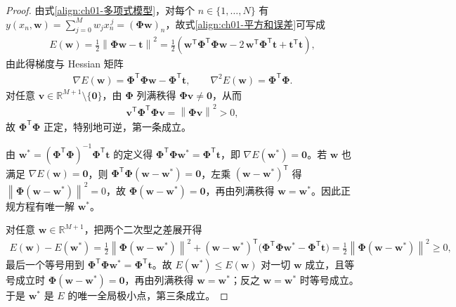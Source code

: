 \documentclass[../../main.tex]{subfiles}
\begin{document}
\begin{proof}
由式\eqref{align:ch01-多项式模型}，对每个 $n\in\{1,\dots,N\}$ 有 $y(x_n,\mathbf{w})=\sum_{j=0}^{M}w_jx_n^{\,j}=(\boldsymbol{\Phi}\mathbf{w})_n$，故式\eqref{align:ch01-平方和误差}可写成
\begin{align*}
 E(\mathbf{w}) = \frac{1}{2}\left\|\boldsymbol{\Phi}\mathbf{w}-\mathbf{t}\right\|^{2}
 = \frac{1}{2}\left(\mathbf{w}^{\mathsf{T}}\boldsymbol{\Phi}^{\mathsf{T}}\boldsymbol{\Phi}\mathbf{w}
 - 2\,\mathbf{w}^{\mathsf{T}}\boldsymbol{\Phi}^{\mathsf{T}}\mathbf{t}
 + \mathbf{t}^{\mathsf{T}}\mathbf{t}\right),
\end{align*}
由此得梯度与 Hessian 矩阵
\begin{align*}
 \nabla E(\mathbf{w}) = \boldsymbol{\Phi}^{\mathsf{T}}\boldsymbol{\Phi}\mathbf{w} - \boldsymbol{\Phi}^{\mathsf{T}}\mathbf{t},
 \qquad
 \nabla^{2} E(\mathbf{w}) = \boldsymbol{\Phi}^{\mathsf{T}}\boldsymbol{\Phi}.
\end{align*}
对任意 $\mathbf{v}\in\mathbb{R}^{M+1}\setminus\{\mathbf{0}\}$，由 $\boldsymbol{\Phi}$ 列满秩得 $\boldsymbol{\Phi}\mathbf{v}\neq\mathbf{0}$，从而
\begin{align*}
 \mathbf{v}^{\mathsf{T}}\boldsymbol{\Phi}^{\mathsf{T}}\boldsymbol{\Phi}\mathbf{v} = \left\|\boldsymbol{\Phi}\mathbf{v}\right\|^{2} > 0,
\end{align*}
故 $\boldsymbol{\Phi}^{\mathsf{T}}\boldsymbol{\Phi}$ 正定，特别地可逆，第一条成立。

由 $\mathbf{w}^{*}=(\boldsymbol{\Phi}^{\mathsf{T}}\boldsymbol{\Phi})^{-1}\boldsymbol{\Phi}^{\mathsf{T}}\mathbf{t}$ 的定义得 $\boldsymbol{\Phi}^{\mathsf{T}}\boldsymbol{\Phi}\mathbf{w}^{*}=\boldsymbol{\Phi}^{\mathsf{T}}\mathbf{t}$，即 $\nabla E(\mathbf{w}^{*})=\mathbf{0}$。若 $\mathbf{w}$ 也满足 $\nabla E(\mathbf{w})=\mathbf{0}$，则 $\boldsymbol{\Phi}^{\mathsf{T}}\boldsymbol{\Phi}(\mathbf{w}-\mathbf{w}^{*})=\mathbf{0}$，左乘 $(\mathbf{w}-\mathbf{w}^{*})^{\mathsf{T}}$ 得 $\left\|\boldsymbol{\Phi}(\mathbf{w}-\mathbf{w}^{*})\right\|^{2}=0$，故 $\boldsymbol{\Phi}(\mathbf{w}-\mathbf{w}^{*})=\mathbf{0}$，再由列满秩得 $\mathbf{w}=\mathbf{w}^{*}$。因此正规方程有唯一解 $\mathbf{w}^{*}$。

对任意 $\mathbf{w}\in\mathbb{R}^{M+1}$，把两个二次型之差展开得
\begin{align*}
 E(\mathbf{w}) - E(\mathbf{w}^{*})
 = \frac{1}{2}\left\|\boldsymbol{\Phi}(\mathbf{w}-\mathbf{w}^{*})\right\|^{2}
 + (\mathbf{w}-\mathbf{w}^{*})^{\mathsf{T}}\bigl(\boldsymbol{\Phi}^{\mathsf{T}}\boldsymbol{\Phi}\mathbf{w}^{*}-\boldsymbol{\Phi}^{\mathsf{T}}\mathbf{t}\bigr)
 = \frac{1}{2}\left\|\boldsymbol{\Phi}(\mathbf{w}-\mathbf{w}^{*})\right\|^{2} \geqslant 0,
\end{align*}
最后一个等号用到 $\boldsymbol{\Phi}^{\mathsf{T}}\boldsymbol{\Phi}\mathbf{w}^{*}=\boldsymbol{\Phi}^{\mathsf{T}}\mathbf{t}$。故 $E(\mathbf{w}^{*})\leqslant E(\mathbf{w})$ 对一切 $\mathbf{w}$ 成立，且等号成立时 $\boldsymbol{\Phi}(\mathbf{w}-\mathbf{w}^{*})=\mathbf{0}$，再由列满秩得 $\mathbf{w}=\mathbf{w}^{*}$；反之 $\mathbf{w}=\mathbf{w}^{*}$ 时等号成立。于是 $\mathbf{w}^{*}$ 是 $E$ 的唯一全局极小点，第三条成立。
\end{proof}
\end{document}
